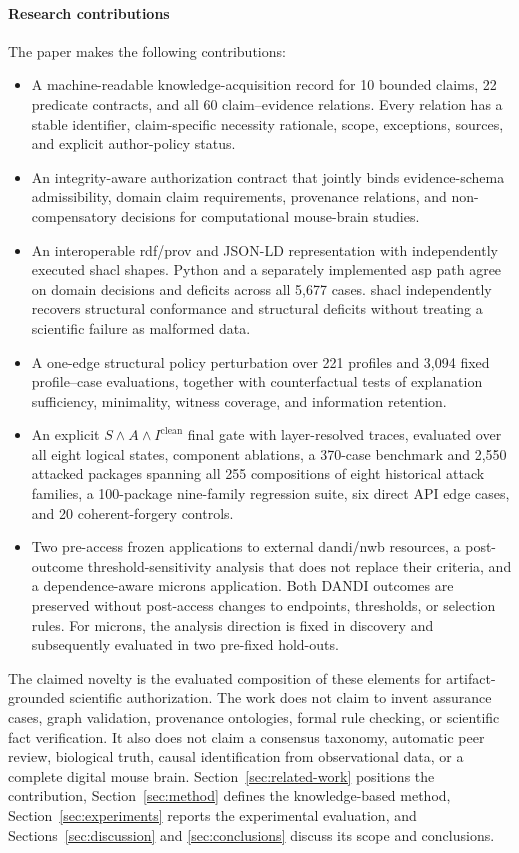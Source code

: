\paragraph{Research contributions}\label{sec:contributions}
The paper makes the following contributions:
\begin{itemize}
\item A machine-readable knowledge-acquisition record for 10 bounded claims, 22 predicate contracts, and all 60 claim--evidence relations. Every relation has a stable identifier, claim-specific necessity rationale, scope, exceptions, sources, and explicit author-policy status.
\item An integrity-aware authorization contract that jointly binds evidence-schema admissibility, domain claim requirements, provenance relations, and non-compensatory decisions for computational mouse-brain studies.
\item An interoperable \ac{rdf}/\ac{prov} and JSON-LD representation with independently executed \ac{shacl} shapes. Python and a separately implemented \ac{asp} path agree on domain decisions and deficits across all 5,677 cases. \ac{shacl} independently recovers structural conformance and structural deficits without treating a scientific failure as malformed data.
\item A one-edge structural policy perturbation over 221 profiles and 3,094 fixed profile--case evaluations, together with counterfactual tests of explanation sufficiency, minimality, witness coverage, and information retention.
\item An explicit $S\land A\land I^{\mathrm{clean}}$ final gate with layer-resolved traces, evaluated over all eight logical states, component ablations, a 370-case benchmark and 2,550 attacked packages spanning all 255 compositions of eight historical attack families, a 100-package nine-family regression suite, six direct API edge cases, and 20 coherent-forgery controls.
\item Two pre-access frozen applications to external \ac{dandi}/\ac{nwb} resources, a post-outcome threshold-sensitivity analysis that does not replace their criteria, and a dependence-aware \ac{microns} application. Both DANDI outcomes are preserved without post-access changes to endpoints, thresholds, or selection rules. For \ac{microns}, the analysis direction is fixed in discovery and subsequently evaluated in two pre-fixed hold-outs.
\end{itemize}

The claimed novelty is the evaluated composition of these elements for artifact-grounded scientific authorization. The work does not claim to invent assurance cases, graph validation, provenance ontologies, formal rule checking, or scientific fact verification. It also does not claim a consensus taxonomy, automatic peer review, biological truth, causal identification from observational data, or a complete digital mouse brain. Section~\ref{sec:related-work} positions the contribution, Section~\ref{sec:method} defines the knowledge-based method, Section~\ref{sec:experiments} reports the experimental evaluation, and Sections~\ref{sec:discussion} and \ref{sec:conclusions} discuss its scope and conclusions.
